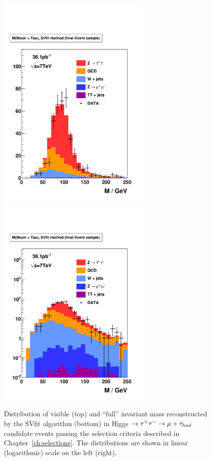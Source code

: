 \begin{figure}[t]
\begin{center}
\includegraphics*[width=75mm]{results_chapter/figures/results_loose/plotAHtoMuTauOS_woBtag_finalSamplePlots_mSVmethod_linear.pdf}
\includegraphics*[width=75mm]{results_chapter/figures/results_loose/plotAHtoMuTauOS_woBtag_finalSamplePlots_mSVmethod_log.pdf}
\caption[Distributions of final selected events]{Distribution of visible (top)
and ``full'' \TT invariant mass reconstructed by the SVfit algorithm (bottom) in
Higgs $\to \tau^+\tau^- \to \mu + \tau_{had}$ candidate events passing the selection
criteria described in Chapter~\ref{ch:selections}.  The distributions are shown
in linear (logarithmic) scale on the left (right).}
\label{fig:AHtoMuTauPlotsLoose}
\end{center}
\end{figure} 
\ifx\master\undefined\fi
